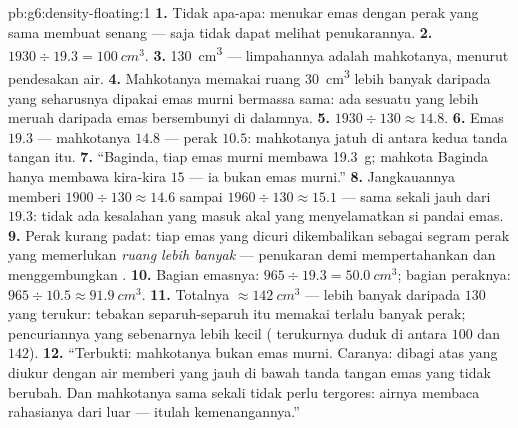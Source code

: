 \begin{solution}{pb:g6:density-floating:1}
\textbf{1.} Tidak apa-apa: menukar emas dengan \emph{} perak yang
sama membuat  senang ---  saja tidak dapat melihat
penukarannya.
\textbf{2.} $1930 \div 19.3 = \qty{100}{cm^3}$.
\textbf{3.} \qty{130}{cm^3} --- limpahannya adalah  mahkotanya,
menurut pendesakan air.
\textbf{4.} Mahkotanya memakai ruang \qty{30}{cm^3} lebih banyak
daripada yang seharusnya dipakai emas murni bermassa sama: ada sesuatu
yang lebih meruah daripada emas bersembunyi di dalamnya.
\textbf{5.} $1930 \div 130 \approx 14.8$.
\textbf{6.} Emas $19.3$ --- mahkotanya $14.8$ --- perak $10.5$:
mahkotanya jatuh di antara kedua tanda tangan itu.
\textbf{7.} ``Baginda, tiap  emas murni membawa
\qty{19.3}{g}; mahkota Baginda hanya membawa kira-kira $15$ --- ia
bukan emas murni.''
\textbf{8.} Jangkauannya memberi  $1900 \div 130 \approx
14.6$ sampai $1960 \div 130 \approx 15.1$ --- sama sekali jauh dari
$19.3$: tidak ada kesalahan  yang masuk akal yang menyelamatkan
si pandai emas.
\textbf{9.} Perak kurang padat: tiap  emas yang dicuri
dikembalikan sebagai segram perak yang memerlukan \emph{ruang lebih
banyak} --- penukaran  demi  mempertahankan  dan
menggembungkan .
\textbf{10.} Bagian emasnya: $965 \div 19.3 = \qty{50.0}{cm^3}$;
bagian peraknya: $965 \div 10.5 \approx \qty{91.9}{cm^3}$.
\textbf{11.} Totalnya $\approx \qty{142}{cm^3}$ --- lebih banyak
daripada $130$ yang terukur: tebakan separuh-separuh itu memakai
terlalu banyak perak; pencuriannya yang sebenarnya lebih kecil (
terukurnya duduk di antara $100$ dan $142$).
\textbf{12.} ``Terbukti: mahkotanya bukan emas murni. Caranya:
 dibagi atas  yang diukur dengan air memberi  yang jauh di bawah tanda tangan emas yang tidak berubah. Dan
mahkotanya sama sekali tidak perlu tergores: airnya membaca rahasianya
dari luar --- itulah kemenangannya.''
\end{solution}
